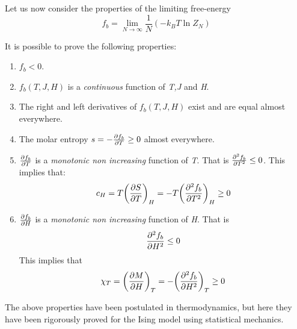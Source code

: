 \documentclass[../main/main.tex]{subfiles}
\begin{document}
Let us now consider the properties of the limiting free-energy
\begin{equation}
  f_b = \lim_{N \rightarrow \infty } \frac{1}{N} (-k_B T \ln{Z_N} )
\end{equation}
\begin{greenbox}
  It is possible to prove the following properties:
  \begin{enumerate}
  \item \( f_b < 0 \).
  \item \( f_b (T,J,H) \) is a \emph{continuous} function of \emph{T,J} and \emph{H}.
  \item The right and left derivatives of \( f_b (T,J,H) \) exist and are equal almost everywhere.
  \item The molar entropy \( s = - \pdv{f_b}{T} \ge 0\)    almost everywhere.
  \item \( \pdv{f_b}{T}  \) is a \emph{monotonic non increasing} function of \emph{T}. That is \( \pdv[2]{f_b}{T} \le  0 \). This implies that:
  \begin{equation}
    c_H = T \qty(\pdv{S}{T} )_H = - T \qty(\pdv[2]{f_b}{T} )_H \ge 0
  \end{equation}
  \item \( \pdv{f_b}{H}  \) is a \emph{monotonic non increasing} function of \emph{H}. That is
  \begin{equation}
    \pdv[2]{f_b}{H} \le 0
  \end{equation}
  This implies that
  \begin{equation}
    \chi _T = \qty(\pdv{M}{H} )_T = - \qty(\pdv[2]{f_b}{H})_T \ge 0
  \end{equation}
  \end{enumerate}
\end{greenbox}
\begin{remark}
The above properties have been postulated in thermodynamics, but here they have been rigorously proved for the Ising model using statistical mechanics.
\end{remark}
\end{document}
